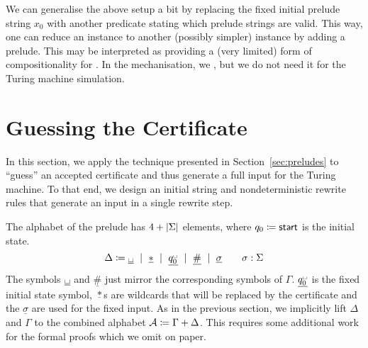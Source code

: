 \begin{remark}
  We can generalise the above setup a bit by replacing the fixed initial prelude string $x_0$ with another predicate stating which prelude strings are valid. This way, one can reduce an \expr{} instance to another (possibly simpler) \expr{} instance by adding a prelude.
  This may be interpreted as providing a (very limited) form of compositionality for \PR{}. 
  In the mechanisation, we , but we do not need it for the Turing machine simulation.
\end{remark}

\section{Guessing the Certificate}
In this section, we apply the technique presented in Section~\ref{sec:preludes} to ``guess'' an accepted certificate and thus generate a full input for the Turing machine. To that end, we design an initial string and nondeterministic rewrite rules that generate an input in a single rewrite step.

\newcommand{\nblank}{\ensuremath{\underline{\blank}}}
\newcommand{\ndelim}{\ensuremath{\underline{\#}}}
\newcommand{\nstar}{\ensuremath{\underline{*}}}
\newcommand{\ninit}{\ensuremath{\underline{q_0^{\blank}}}}
\newcommand{\nsig}[1]{\ensuremath{\underline{#1}}}

\newcommand{\initStr}{\textsf{initStr}}
\newcommand{\Rprelude}{\ensuremath{R_{\text{prelude}}}}

The alphabet \mnotec[preludeSig']{$\Delta$} of the prelude has $4 + |\Sigma|$ elements, where $q_0 \coloneqq \textsf{start}$ is the initial state.
\[\Delta \defeq \nblank \bnfmid \nstar \bnfmid \ninit \bnfmid \ndelim \bnfmid \nsig{\sigma} \qquad \sigma : \Sigma\]
The symbols $\nblank$ and $\ndelim$ just mirror the corresponding symbols of $\Gamma$. $\ninit$ is the fixed initial state symbol, $\nstar$s are wildcards that will be replaced by the certificate and the $\nsig{\sigma}$ are used for the fixed input. 
As in the previous section, we implicitly lift $\Delta$ and $\Gamma$ to the combined alphabet $\mathcal{A}\coloneqq \Gamma + \Delta$. This requires some additional work for the formal proofs which we omit on paper.

